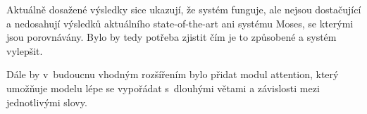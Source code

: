 Aktuálně dosažené výsledky sice ukazují, že systém funguje, ale nejsou dostačující a nedosahují výsledků aktuálního state-of-the-art ani systému Moses, se kterými jsou porovnávány. Bylo by tedy potřeba zjistit čím je to způsobené a systém vylepšit.

Dále by v~budoucnu vhodným rozšířením bylo přidat modul attention, který umožňuje modelu lépe se vypořádat s~dlouhými větami a závislosti mezi jednotlivými slovy.

%

